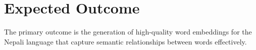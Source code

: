 \chapter{Expected Outcome}
\noindent
The primary outcome is the generation of high-quality word embeddings for the Nepali language that capture semantic relationships between words effectively.
